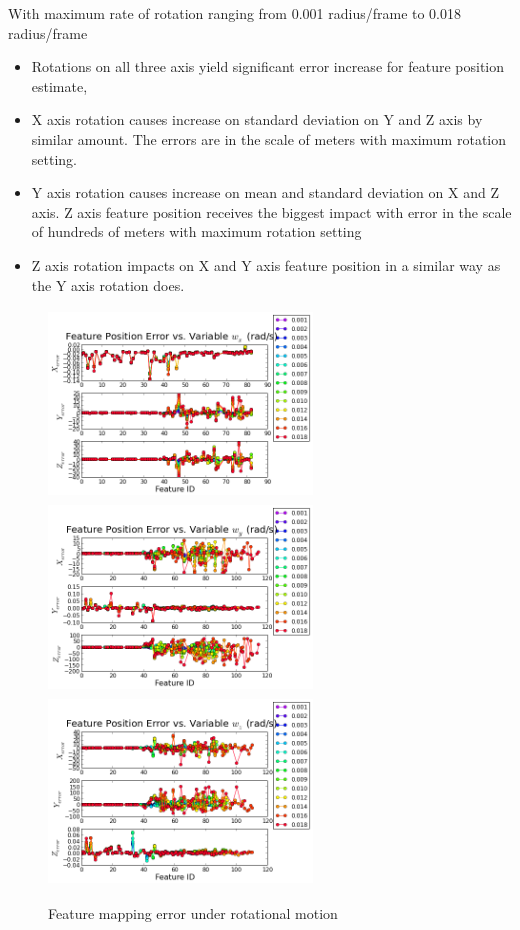 With maximum rate of rotation ranging from 0.001 radius/frame to 0.018
radius/frame

\begin{itemize}
  \item Rotations on all three axis yield significant error increase for feature position estimate,
  \item X axis rotation causes increase on standard deviation on Y and Z axis by similar amount. The errors are in the scale of meters with maximum rotation setting.
  \item Y axis rotation causes increase on mean and standard deviation on X and Z axis. Z axis feature position receives the biggest impact with error in the scale of hundreds of meters with maximum rotation setting
  \item Z axis rotation impacts on X and Y axis feature position in a
  similar way as the Y axis rotation does.
\end{itemize}

\begin{figure}[h]%
  \centering
  \includegraphics[width=7cm, height=5cm]{./Figures/SimulationFigures/Figure17.png}
  \includegraphics[width=7cm, height=5cm]{./Figures/SimulationFigures/Figure18.png}
  \includegraphics[width=7cm, height=5cm]{./Figures/SimulationFigures/Figure19.png}
  \caption{Feature mapping error under rotational motion}
  \label{fig:simfig17-19}
\end{figure}

